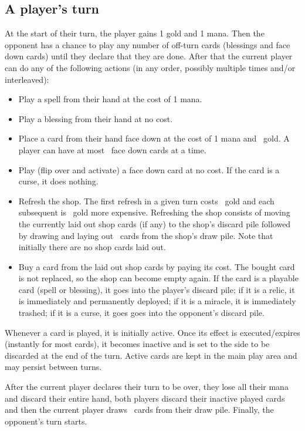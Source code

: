 \documentclass[dvipsnames,parskip,a4paper]{scrartcl}
\begin{document}
\subsection*{A player's turn}

At the start of their turn, the player gains 1 gold and 1 mana. Then the opponent has a chance to play any number of off-turn cards (blessings and face down cards) until they declare that they are done. After that the current player can do any of the following actions (in any order, possibly multiple times and/or interleaved):

\begin{itemize}
\item Play a spell from their hand at the cost of 1 mana.
\item Play a blessing from their hand at no cost.
\item Place a card from their hand face down at the cost of 1 mana and \facedowncost \ gold. A player can have at most \facedownsize \ face down cards at a time.
\item Play (flip over and activate) a face down card at no cost. If the card is a curse, it does nothing.
\item Refresh the shop. The first refresh in a given turn costs  \ gold and each subsequent is  \ gold more expensive.
Refreshing the shop consists of moving the currently laid out shop cards (if any) to the shop's discard pile followed by drawing and laying out \shopsize \ cards from the shop's draw pile. Note that initially there are no shop cards laid out.
\item Buy a card from the laid out shop cards by paying its cost.
The bought card is not replaced, so the shop can become empty again. If the card is a playable card (spell or blessing), it goes into the player's discard pile; if it is a relic, it is immediately and permanently deployed; if it is a miracle, it is immediately trashed; if it is a curse, it goes goes into the opponent's discard pile.
\end{itemize}

Whenever a card is played, it is initially active. Once its effect is executed/expires (instantly for most cards), it becomes inactive and is set to the side to be discarded at the end of the turn. Active cards are kept in the main play area and may persist between turns.

\vspace{4pt}

After the current player declares their turn to be over, they lose all their mana and discard their entire hand, both players discard their inactive played cards and then the current player draws \handsize \ cards from their draw pile. Finally, the opponent's turn starts.
\end{document}
